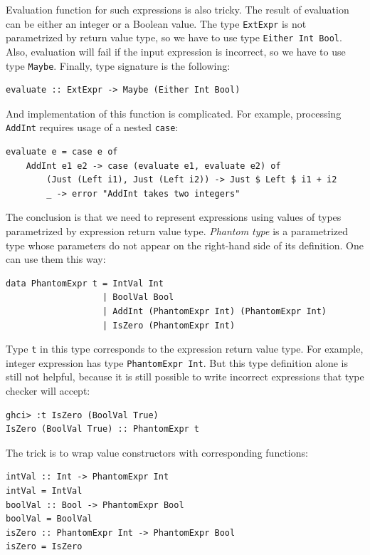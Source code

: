 \documentclass{tmr}
\newcommand{\italic}[1]{\textit{#1}}
\begin{document}
Evaluation function for such expressions is also tricky. The result of evaluation can be either an integer or a Boolean value. The type \verb|ExtExpr| is not parametrized by return value type, so we have to use type \verb|Either Int Bool|. Also, evaluation will fail if the input expression is incorrect, so we have to use type \verb|Maybe|. Finally, type signature is the following:

\begin{Verbatim}
evaluate :: ExtExpr -> Maybe (Either Int Bool)
\end{Verbatim}

And implementation of this function is complicated. For example, processing \verb|AddInt| requires usage of a nested \verb|case|:

\begin{Verbatim}
evaluate e = case e of
    AddInt e1 e2 -> case (evaluate e1, evaluate e2) of
        (Just (Left i1), Just (Left i2)) -> Just $ Left $ i1 + i2
        _ -> error "AddInt takes two integers"
\end{Verbatim}

The conclusion is that we need to represent expressions using values of types parametrized by expression return value type. \italic{Phantom type} is a parametrized type whose parameters do not appear on the right-hand side of its definition. One can use them this way:

\begin{Verbatim}
data PhantomExpr t = IntVal Int
                   | BoolVal Bool
                   | AddInt (PhantomExpr Int) (PhantomExpr Int)
                   | IsZero (PhantomExpr Int)
\end{Verbatim}

Type \verb|t| in this type corresponds to the expression return value type. For example, integer expression has type \verb|PhantomExpr Int|. But this type definition alone is still not helpful, because it is still possible to write incorrect expressions that type checker will accept:

\begin{Verbatim}
ghci> :t IsZero (BoolVal True)
IsZero (BoolVal True) :: PhantomExpr t
\end{Verbatim}

The trick is to wrap value constructors with corresponding functions:

\begin{Verbatim}
intVal :: Int -> PhantomExpr Int
intVal = IntVal
boolVal :: Bool -> PhantomExpr Bool
boolVal = BoolVal
isZero :: PhantomExpr Int -> PhantomExpr Bool
isZero = IsZero
\end{Verbatim}
\end{document}
